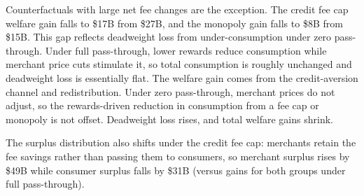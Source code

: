 \documentclass[main.tex]{subfiles}
\begin{document}
Counterfactuals with large net fee changes are the exception.
The credit fee cap welfare gain falls to \$17B from \$27B, and the monopoly gain falls to \$8B from \$15B.
This gap reflects deadweight loss from under-consumption under zero pass-through.
Under full pass-through, lower rewards reduce consumption while merchant price cuts stimulate it, so total consumption is roughly unchanged and deadweight loss is essentially flat. 
The welfare gain comes from the credit-aversion channel and redistribution.
Under zero pass-through, merchant prices do not adjust, so the rewards-driven reduction in consumption from a fee cap or monopoly is not offset. 
Deadweight loss rises, and total welfare gains shrink.

The surplus distribution also shifts under the credit fee cap: merchants retain the fee savings rather than passing them to consumers, so merchant surplus rises by \$49B while consumer surplus falls by \$31B (versus gains for both groups under full pass-through).

\begin{table}[ht!]
    \caption{Counterfactual effects on prices and shares: No merchant fee pass-through}
    \label{tab:cf-prices-nopass}
    \centering
    \small{
    
    }
\end{table}

\begin{table}[ht!]
    \caption{Counterfactual welfare effects: No merchant fee pass-through}
    \label{tab:cf-effects-nopass}
    \centering
    \small{
    
    }
\end{table}
\end{document}
